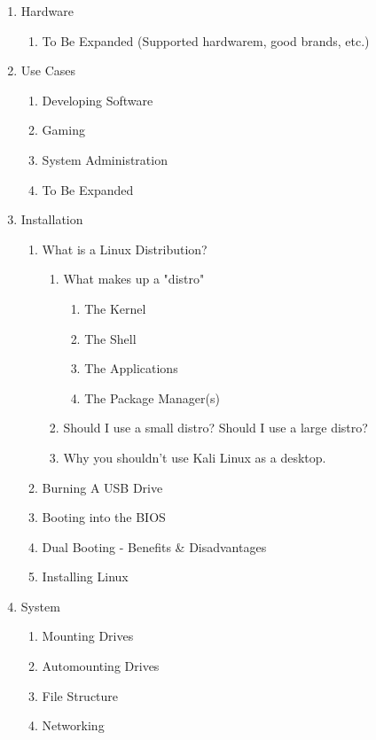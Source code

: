 \documentclass {report}
\begin{document}
\begin{enumerate}
  \item Hardware
    \begin{enumerate}
      \item To Be Expanded (Supported hardwarem, good brands, etc.)
    \end{enumerate}
  \item Use Cases
    \begin{enumerate}
      \item Developing Software
      \item Gaming
      \item System Administration
      \item To Be Expanded
    \end{enumerate}
  \item Installation
    \begin{enumerate}
      \item What is a Linux Distribution?
        \begin{enumerate}
          \item What makes up a "distro"
            \begin{enumerate}
              \item The Kernel
              \item The Shell
              \item The Applications
              \item The Package Manager(s)
            \end{enumerate}
          \item Should I use a small distro? Should I use a large distro?
          \item Why you shouldn't use Kali Linux as a desktop.
        \end{enumerate}
      \item Burning A USB Drive
      \item Booting into the BIOS
      \item Dual Booting - Benefits \& Disadvantages
      \item Installing Linux
    \end{enumerate}
  \item System
    \begin{enumerate}
      \item Mounting Drives
      \item Automounting Drives
      \item File Structure
      \item Networking

\end{enumerate}
\end{enumerate}
\end{document}
